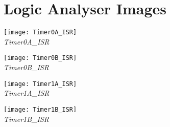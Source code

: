 \documentclass[twoside]{article}
\begin{document}
\section*{Logic Analyser Images}
\texttt{[image: Timer0A\_ISR]}\\
\emph{Timer0A\_ISR}\\
\vskip 0.1in

\texttt{[image: Timer0B\_ISR]}\\
\emph{Timer0B\_ISR}\\
\vskip 0.1in

\texttt{[image: Timer1A\_ISR]}\\
\emph{Timer1A\_ISR}\\
\vskip 0.1in

\texttt{[image: Timer1B\_ISR]}\\
\emph{Timer1B\_ISR}\\
\vskip 0.1in
\end{document}

